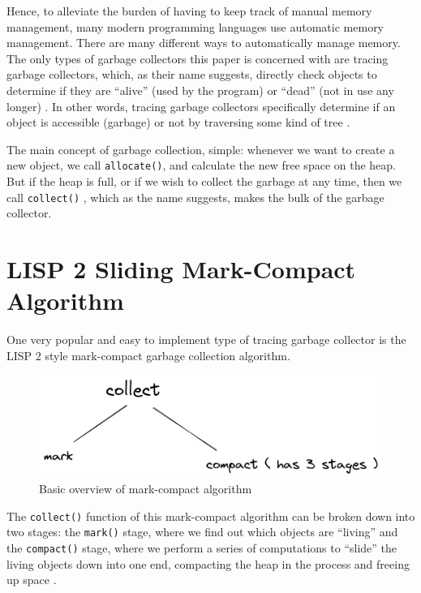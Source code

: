 \documentclass[index]{subfiles}
\begin{document}
Hence, to alleviate the burden of having to keep track of manual memory management, many modern programming languages use automatic memory management. There are many different ways to automatically manage memory. The only types of garbage collectors this paper is concerned with are tracing garbage collectors, which, as their name suggests, directly check objects to determine if they are ``alive'' (used by the program) or ``dead'' (not in use any longer) \cite{a_unified_theory_of_garbage_collection}. In other words, tracing garbage collectors specifically determine if an object is accessible (garbage) or not by traversing some kind of tree \cite[Chapter~1]{gc_handbook}.

The main concept of garbage collection, simple: whenever we want to create a new object, we call \verb+allocate()+, and calculate the new free space on the heap. But if the heap is full, or if we wish to collect the garbage at any time, then we call \verb+collect()+ \cite{gc_handbook}, which as the name suggests, makes the bulk of the garbage collector.

\section{LISP 2 Sliding Mark-Compact Algorithm}

One very popular and easy to implement type of tracing garbage collector is the LISP 2 style mark-compact garbage collection algorithm.

\begin{figure}[H]
    \centering
    \includegraphics[scale=0.3]{pics/mark-compact-overview.png}
    \caption{Basic overview of mark-compact algorithm}
\end{figure}

The \verb+collect()+ function of this mark-compact algorithm can be broken down into two stages: the \verb+mark()+ stage, where we find out which objects are ``living'' and the \verb+compact()+ stage, where we perform a series of computations to ``slide'' the living objects down into one end, compacting the heap in the process and freeing up space \cite[Chapter~3]{gc_handbook}.
\end{document}
